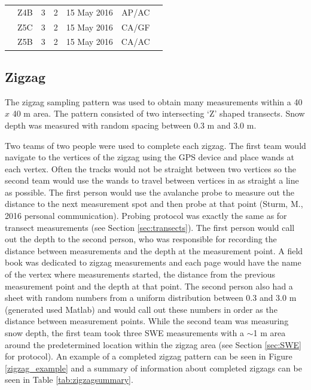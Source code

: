 \documentclass{sfuthesis}
\begin{document}
\begin{table}[]
\begin{tabular}{ccccccl}
                      & Z4B               & 3                                                               & 2                                                                             & 15 May 2016   & AP/AC              &                                                                              \\
                      & Z5C               & 3                                                               & 2                                                                             & 15 May 2016   & CA/GF              &                                                                              \\
                      & Z5B               & 3                                                               & 2                                                                             & 15 May 2016   & CA/AC              &                                                                             
\end{tabular}
\end{table}



\subsection{Zigzag}
\label{sec:zigzagmethods}

The zigzag sampling pattern was used to obtain many measurements within a 40 $x$ 40 m area.  The pattern consisted of two intersecting `Z' shaped transects. Snow depth was measured with random spacing between 0.3 m and 3.0 m. 

Two teams of two people were used to complete each zigzag. The first team would navigate to the vertices of the zigzag using the GPS device and place wands at each vertex. Often the tracks would not be straight between two vertices so the second team would use the wands to travel between vertices in as straight a line as possible. The first person would use the avalanche probe to measure out the distance to the next measurement spot and then probe at that point (Sturm, M., 2016 personal communication). Probing protocol was exactly the same as for transect measurements (see Section \ref{sec:transects}). The first person would call out the depth to the second person, who was responsible for recording the distance between measurements and the depth at the measurement point. A field book was dedicated to zigzag measurements and each page would have the name of the vertex where measurements started, the distance from the previous measurement point and the depth at that point. The second person also had a sheet with random numbers from a uniform distribution between 0.3 and 3.0 m (generated used Matlab) and would call out these numbers in order as the distance between measurement points. While the second team was measuring snow depth, the first team took three SWE measurements with a $\sim$1 m area around the predetermined location within the zigzag area (see Section \ref{sec:SWE} for protocol). An example of a completed zigzag pattern can be seen in Figure \ref{zigzag_example} and a summary of information about completed zigzags can be seen in Table \ref{tab:zigzagsummary}.  
\end{document}
